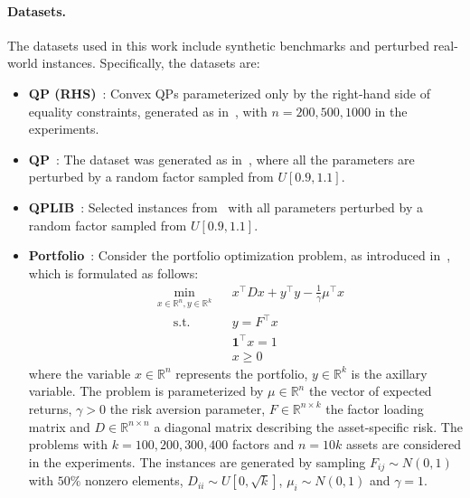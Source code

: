 \documentclass[10pt]{article} %
\begin{document}
\paragraph{Datasets.}
The datasets used in this work include synthetic benchmarks and perturbed real-world instances. 
Specifically, the datasets are:
\begin{itemize}
    \item[(i)] \textbf{QP (RHS)}~\citep{dontidc3}: Convex QPs parameterized only by the right-hand side of equality constraints, generated as in~\citet{dontidc3}, with $n=200, 500, 1000$ in the experiments. 
    
    \item[(ii)] \textbf{QP}~\citep{gao2024ipm}: 
    The dataset was generated as in~\citet{gao2024ipm}, where all the parameters are perturbed by a random factor sampled from $U[0.9, 1.1]$.
    
    \item[(iii)] \textbf{QPLIB}~\citep{furini2019qplib}: 
    Selected instances from~\citet{furini2019qplib} with all parameters perturbed by a random factor sampled from $U[0.9, 1.1]$.
    
    \item[(iv)] \textbf{Portfolio}~\citep{stellato2020osqp}: Consider the portfolio optimization problem, as introduced in~\citet{stellato2020osqp}, which is formulated as follows:
\begin{equation*}
\begin{aligned}
   & \underset{x\in\mathbb{R}^n, y\in\mathbb{R}^k}{\min} && x^\top D x + y^\top y -\frac{1}{\gamma} \mu^\top x \\
   &\quad \; \text{s.t.} && y=F^\top x \\
    &&&               \mathbf{1}^\top x = 1\\
    &&&               x \geq 0
\end{aligned}
\end{equation*}
where the variable $x\in \mathbb{R}^n$ represents the portfolio, $y\in \mathbb{R}^k$ is the axillary variable.
The problem is parameterized by $\mu\in\mathbb{R}^n$ the vector of expected returns, $\gamma >0$ the risk aversion parameter, $F\in\mathbb{R}^{n\times k}$ the factor loading matrix and $D\in\mathbb{R}^{n\times n}$ a diagonal matrix describing the asset-specific risk.
The problems with $k=100, 200, 300, 400$ factors and $n=10k$ assets are considered in the experiments.
The instances are generated by sampling $F_{ij} \sim N(0,1)$ with $50\%$ nonzero elements, $D_{ii} \sim U[0, \sqrt{k}]$, $\mu_i\sim N(0,1)$ and $\gamma=1$.
\end{itemize}
\end{document}
